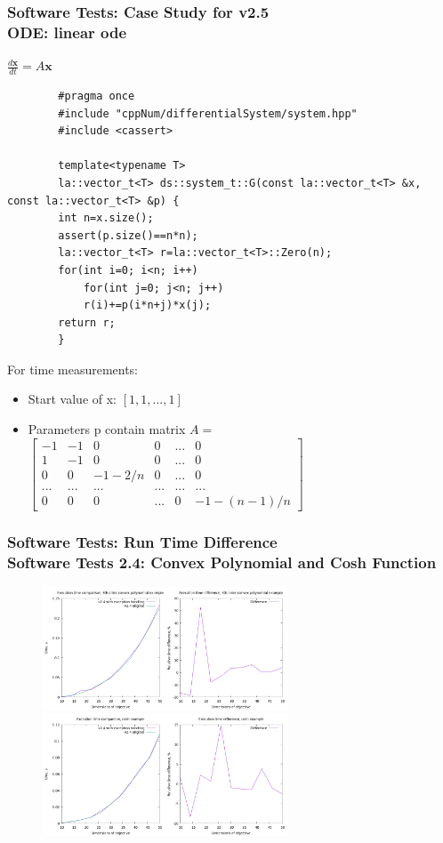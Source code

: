 \documentclass[ucs,10pt]{beamer}
\begin{document}
\begin{frame}[fragile]
\frametitle{Software Tests: Case Study for v2.5 \\
	\small \color{rwth-blue} ODE: linear ode}
	$\frac{d\mathbf{x}}{dt} = A \mathbf{x}$

	\begin{lstlisting}
		#pragma once
		#include "cppNum/differentialSystem/system.hpp"
		#include <cassert>
		
		template<typename T>
		la::vector_t<T> ds::system_t::G(const la::vector_t<T> &x, const la::vector_t<T> &p) {
		int n=x.size();
		assert(p.size()==n*n);
		la::vector_t<T> r=la::vector_t<T>::Zero(n);
		for(int i=0; i<n; i++)
			for(int j=0; j<n; j++)
			r(i)+=p(i*n+j)*x(j);
		return r;
		}
	\end{lstlisting}
	 For time measurements:
        \begin{itemize}
                \item Start value of x: $[1, 1, ..., 1]$
		\item Parameters p contain matrix $A=$
		{\tiny
		$\begin{bmatrix}
			-1 & -1 & 0 & 0 &... & 0\\
			1 & -1 & 0 & 0 &... & 0\\
			0 & 0 & -1-2/n & 0 & ... & 0\\
			... & ... & ... & ... & ... & ...\\
			0 & 0 & 0 & ... & 0 & -1-(n-1)/n 
		\end{bmatrix}$}
        \end{itemize}
\end{frame}
	
\begin{frame}
\frametitle{Software Tests: Run Time Difference \\
	\small \color{rwth-blue} Software Tests 2.4: Convex Polynomial and Cosh Function}
	\begin{figure}
		\centering
		\includegraphics[width=0.65\textwidth]{figures/2.4_4th_order_convex_polynomial.png}
		\vspace{0.3cm}
		\includegraphics[width=0.65\textwidth]{figures/2.4_cosh.png}
	\end{figure}
\end{frame}
	
\end{document}
